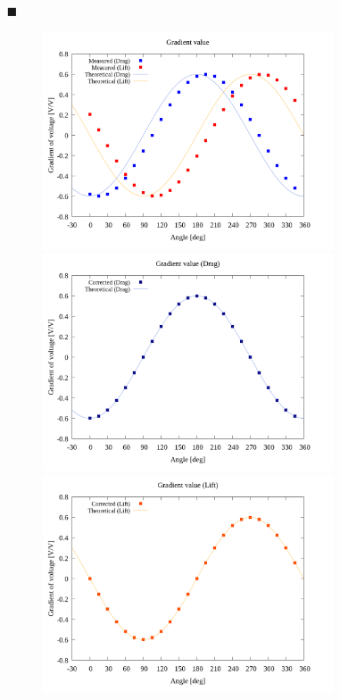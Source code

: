 \documentclass[twocolumn,a4j]{jsarticle}
\begin{document}
\begin{itemize}
    \item [$\blacksquare$] \\
          \begin{figure}[htbp]
              \footnotesize
              \begin{center}
                  \includegraphics[width=86mm]{../graphes/simulation_150_200/20/20_adjust-value.png}
                  \caption{}
                  \includegraphics[width=86mm]{../graphes/simulation_150_200/21/21-2_corrected_drag.png}
                  \caption{}
                  \includegraphics[width=86mm]{../graphes/simulation_150_200/21/21-2_corrected_lift.png}
                  \caption{}
              \end{center}
          \end{figure}       
\end{itemize}
\end{document}
